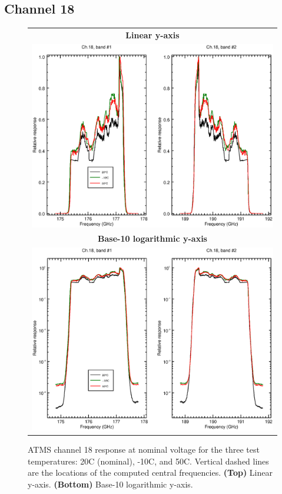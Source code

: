 \subsection{Channel 18}
\begin{figure}[H]
  \label{fig:Tset.ch18_response}
  \centering
  \begin{tabular}{c}
    \hspace{0.75cm}\sffamily\textbf{Linear y-axis} \\
    \includegraphics[scale=0.55]{graphics/srf/Tset/lin/atms_npp-18.eps} \\
    \hspace{0.75cm}\sffamily\textbf{Base-10 logarithmic y-axis} \\
    \includegraphics[scale=0.55]{graphics/srf/Tset/log/atms_npp-18.eps}
  \end{tabular}
  \caption{ATMS channel 18 response at nominal voltage for the three test temperatures: 20\textdegree{}C (nominal), -10\textdegree{}C, and 50\textdegree{}C. Vertical dashed lines are the locations of the computed central frequencies. \textbf{(Top)} Linear y-axis. \textbf{(Bottom)} Base-10 logarithmic y-axis.}
\end{figure}


